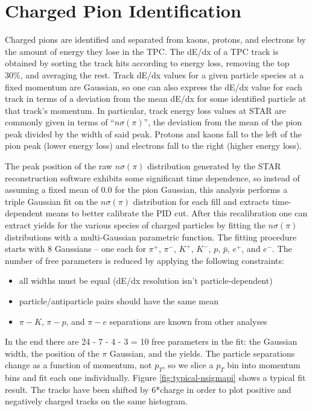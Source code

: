 \section{Charged Pion Identification}

Charged pions are identified and separated from kaons, protons, and electrons
by the amount of energy they lose in the TPC. The dE/dx of a TPC track is
obtained by sorting the track hits according to energy loss, removing the top
30\%, and averaging the rest. Track dE/dx values for a given particle species
at a fixed momentum are Gaussian, so one can also express the dE/dx value for
each track in terms of a deviation from the mean dE/dx for some identified
particle at that track's momentum. In particular, track energy loss values at
STAR are commonly given in terms of ``$n\sigma(\pi)$'', the deviation from the
mean of the pion peak divided by the width of said peak. Protons and kaons
fall to the left of the pion peak (lower energy loss) and electrons fall to
the right (higher energy loss).

The peak position of the raw $n\sigma(\pi)$ distribution generated by the STAR
reconstruction software exhibits some significant time dependence, so instead
of assuming a fixed mean of 0.0 for the pion Gaussian, this analysis performs
a triple Gaussian fit on the $n\sigma(\pi)$ distribution for each fill and
extracts time-dependent means to better calibrate the PID cut. After this
recalibration one can extract yields for the various species of charged
particles by fitting the $n\sigma(\pi)$ distributions with a multi-Gaussian
parametric function. The fitting procedure starts with 8 Gaussians -- one each
for $\pi^{+}$, $\pi^{-}$, $K^{+}$, $K^{-}$, $p$, $\bar{p}$, $e^{+}$, and
$e^{-}$. The number of free parameters is reduced by applying the following
constraints:

\begin{itemize}
    \item all widths must be equal (dE/dx resolution isn't particle-dependent)
    \item particle/antiparticle pairs should have the same mean
    \item $\pi - K$, $\pi - p$, and $\pi - e$ separations are known from other analyses \cite{Xu:2008th}
\end{itemize}

In the end there are 24 - 7 - 4 - 3 = 10 free parameters in the fit: the
Gaussian width, the position of the $\pi$ Gaussian, and the yields. The
particle separations change as a function of momentum, not $p_{T}$, so we
slice a $p_{T}$ bin into momentum bins and fit each one individually. Figure
\ref{fig:typical-nsigmapi} shows a typical fit result. The tracks have been
shifted by 6*charge in order to plot positive and negatively charged tracks on
the same histogram.

